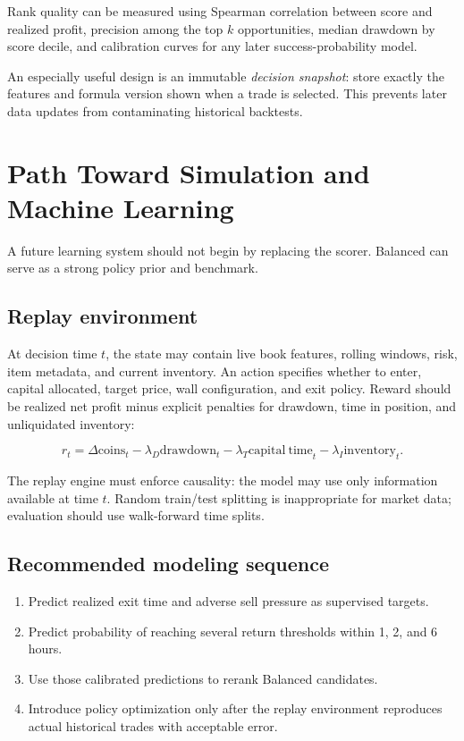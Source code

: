 \documentclass[11pt,a4paper]{article}
\begin{document}
Rank quality can be measured using Spearman correlation between score and realized profit,
precision among the top $k$ opportunities, median drawdown by score decile, and calibration
curves for any later success-probability model.

An especially useful design is an immutable \emph{decision snapshot}: store exactly the
features and formula version shown when a trade is selected. This prevents later data updates
from contaminating historical backtests.

\section{Path Toward Simulation and Machine Learning}

A future learning system should not begin by replacing the scorer. Balanced can serve as a
strong policy prior and benchmark.

\subsection{Replay environment}

At decision time $t$, the state may contain live book features, rolling windows, risk, item
metadata, and current inventory. An action specifies whether to enter, capital allocated,
target price, wall configuration, and exit policy. Reward should be realized net profit minus
explicit penalties for drawdown, time in position, and unliquidated inventory:

\begin{equation}
r_t=\Delta\mathrm{coins}_t
-\lambda_D\mathrm{drawdown}_t
-\lambda_T\mathrm{capital\ time}_t
-\lambda_I\mathrm{inventory}_t.
\end{equation}

The replay engine must enforce causality: the model may use only information available at time
$t$. Random train/test splitting is inappropriate for market data; evaluation should use
walk-forward time splits.

\subsection{Recommended modeling sequence}

\begin{enumerate}
  \item Predict realized exit time and adverse sell pressure as supervised targets.
  \item Predict probability of reaching several return thresholds within 1, 2, and 6 hours.
  \item Use those calibrated predictions to rerank Balanced candidates.
  \item Introduce policy optimization only after the replay environment reproduces actual
  historical trades with acceptable error.
\end{enumerate}
\end{document}
